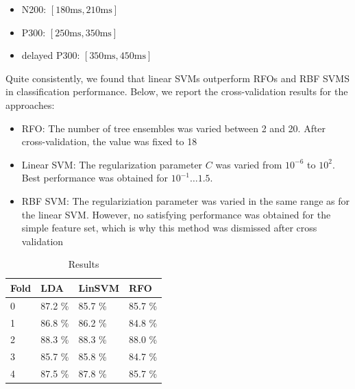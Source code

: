 \documentclass[10pt,a4paper]{article}
\begin{document}
\begin{itemize}
    \item N200: $[180\text{ms},210\text{ms}]$
    \item P300: $[250\text{ms},350\text{ms}]$
    \item delayed P300: $[350\text{ms},450\text{ms}]$
\end{itemize}

Quite consistently, we found that linear SVMs outperform RFOs and RBF SVMS in classification performance.
Below, we report the cross-validation results for the approaches:

\begin{itemize}
    \item RFO: The number of tree ensembles was varied between 2 and 20.
    After cross-validation, the value was fixed to 18
    \item Linear SVM: The regularization parameter $C$ was varied from $10^{-6}$ to $10^2$.
    Best performance was obtained for $10^{-1} \dots 1.5$.
    \item RBF SVM: The regulariziation parameter was varied in the same range as for the linear SVM.
    However, no satisfying performance was obtained for the simple feature set, which is why this method
    was dismissed after cross validation
\end{itemize}

\begin{table}
\begin{tabular}{llll}
\toprule
{Fold} &    LDA & LinSVM & RFO\\
\midrule
0 & 87.2 \% &             85.7 \% &          85.7 \% \\
1 & 86.8 \% &             86.2 \% &          84.8 \% \\
2 & 88.3 \% &             88.3 \% &          88.0 \% \\
3 & 85.7 \% &             85.8 \% &          84.7 \% \\
4 & 87.5 \% &             87.8 \% &          85.7 \% \\
\bottomrule
\end{tabular}
\caption{Results}
\end{table}
\end{document}
